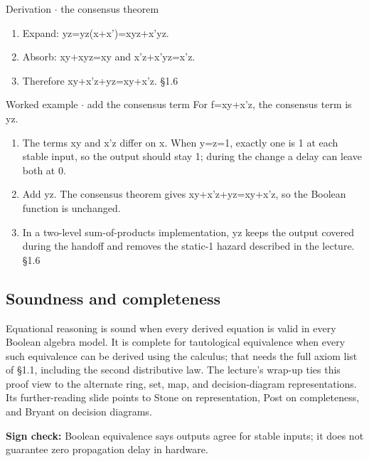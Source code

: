 \documentclass[11pt]{article}
\begin{document}
\begin{keepsection}
\begin{keepsection}
\begin{workedbox}{Derivation \ensuremath{\cdot} the consensus theorem}
\begin{enumerate}
\item Expand: yz=yz(x+x')=xyz+x'yz.
\item Absorb: xy+xyz=xy and x'z+x'yz=x'z.
\item Therefore xy+x'z+yz=xy+x'z. \hfill{\small\color{FAUblue}§1.6}
\end{enumerate}
\end{workedbox}

\begin{workedbox}{Worked example \ensuremath{\cdot} add the consensus term}
For f=xy+x'z, the consensus term is yz.

\begin{enumerate}
\item The terms xy and x'z differ on x. When y=z=1, exactly one is 1 at each stable input, so the output should stay 1; during the change a delay can leave both at 0.
\item Add yz. The consensus theorem gives xy+x'z+yz=xy+x'z, so the Boolean function is unchanged.
\item In a two-level sum-of-products implementation, yz keeps the output covered during the handoff and removes the static-1 hazard described in the lecture. \hfill{\small\color{FAUblue}§1.6}
\end{enumerate}
\end{workedbox}
\end{keepsection}

\begin{keepsection}
\subsection{Soundness and completeness}

Equational reasoning is sound when every derived equation is valid in every Boolean algebra model. It is complete for tautological equivalence when every such equivalence can be derived using the calculus; that needs the full axiom list of §1.1, including the second distributive law. The lecture’s wrap-up ties this proof view to the alternate ring, set, map, and decision-diagram representations. Its further-reading slide points to Stone on representation, Post on completeness, and Bryant on decision diagrams.

\begin{notebox}\textbf{Sign check:} Boolean equivalence says outputs agree for stable inputs; it does not guarantee zero propagation delay in hardware.\end{notebox}


\end{keepsection}
\end{keepsection}
\end{document}
